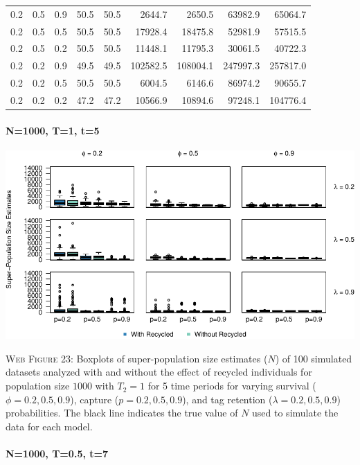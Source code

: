 \documentclass[]{article}
\let\oldparagraph\paragraph
\renewcommand{\paragraph}[1]{\oldparagraph{#1}\mbox{}}
\begin{document}
\begin{table}[ht]
{\begin{tabular}{rrrrrrrrr}
  0.2 & 0.5 & 0.9 & 50.5 & 50.5 & 2644.7 & 2650.5 & 63982.9 & 65064.7 \\ 
  0.2 & 0.5 & 0.5 & 50.5 & 50.5 & 17928.4 & 18475.8 & 52981.9 & 57515.5 \\ 
  0.2 & 0.5 & 0.2 & 50.5 & 50.5 & 11448.1 & 11795.3 & 30061.5 & 40722.3 \\ 
  0.2 & 0.2 & 0.9 & 49.5 & 49.5 & 102582.5 & 108004.1 & 247997.3 & 257817.0 \\ 
  0.2 & 0.2 & 0.5 & 50.5 & 50.5 & 6004.5 & 6146.6 & 86974.2 & 90655.7 \\ 
  0.2 & 0.2 & 0.2 & 47.2 & 47.2 & 10566.9 & 10894.6 & 97248.1 & 104776.4 \\ 
   \hline
\end{tabular}
}
\endgroup
\end{table}

\newpage

\paragraph{N=1000, T=1, t=5}\label{n1000-t1-t5-3}

\includegraphics{Appendix_files/figure-latex/figure23_superN_GJSTL5-1.pdf}

\textsc{Web Figure 23:} Boxplots of super-population size estimates
(\(N\)) of 100 simulated datasets analyzed with and without the effect
of recycled individuals for population size \(1000\) with \(T_2=1\) for
5 time periods for varying survival (\(\phi=0.2,0.5,0.9\)), capture
(\(p=0.2,0.5,0.9\)), and tag retention (\(\lambda=0.2,0.5,0.9\))
probabilities. The black line indicates the true value of \(N\) used to
simulate the data for each model.

\paragraph{N=1000, T=0.5, t=7}\label{n1000-t0.5-t7}
\end{document}

